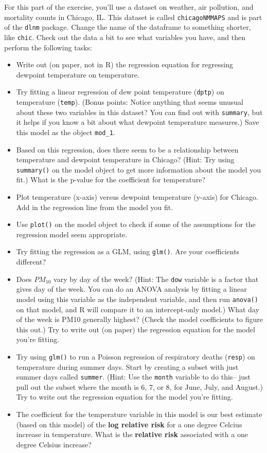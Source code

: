 \documentclass[]{book}
\providecommand{\tightlist}{%
  \setlength{\itemsep}{0pt}\setlength{\parskip}{0pt}}
\theoremstyle{definition}
\theoremstyle{definition}
\theoremstyle{definition}
\theoremstyle{remark}
\begin{document}
For this part of the exercise, you'll use a dataset on weather, air
pollution, and mortality counts in Chicago, IL. This dataset is called
\texttt{chicagoNMMAPS} and is part of the \texttt{dlnm} package. Change
the name of the dataframe to something shorter, like \texttt{chic}.
Check out the data a bit to see what variables you have, and then
perform the following tasks:

\begin{itemize}
\tightlist
\item
  Write out (on paper, not in R) the regression equation for regressing
  dewpoint temperature on temperature.
\item
  Try fitting a linear regression of dew point temperature
  (\texttt{dptp}) on temperature (\texttt{temp}). (Bonus points: Notice
  anything that seems unusual about these two variables in this dataset?
  You can find out with \texttt{summary}, but it helps if you know a bit
  about what dewpoint temperature measures.) Save this model as the
  object \texttt{mod\_1}.
\item
  Based on this regression, does there seem to be a relationship between
  temperature and dewpoint temperature in Chicago? (Hint: Try using
  \texttt{summary()} on the model object to get more information about
  the model you fit.) What is the p-value for the coefficient for
  temperature?
\item
  Plot temperature (x-axis) versus dewpoint temperature (y-axis) for
  Chicago. Add in the regression line from the model you fit.
\item
  Use \texttt{plot()} on the model object to check if some of the
  assumptions for the regression model seem appropriate.
\item
  Try fitting the regression as a GLM, using \texttt{glm()}. Are your
  coefficients different?
\item
  Does \(PM_{10}\) vary by day of the week? (Hint: The \texttt{dow}
  variable is a factor that gives day of the week. You can do an ANOVA
  analysis by fitting a linear model using this variable as the
  independent variable, and then run \texttt{anova()} on that model, and
  R will compare it to an intercept-only model.) What day of the week is
  PM10 generally highest? (Check the model coefficients to figure this
  out.) Try to write out (on paper) the regression equation for the
  model you're fitting.
\item
  Try using \texttt{glm()} to run a Poisson regression of respiratory
  deaths (\texttt{resp}) on temperature during summer days. Start by
  creating a subset with just summer days called \texttt{summer}. (Hint:
  Use the \texttt{month} variable to do this-- just pull out the subset
  where the month is 6, 7, or 8, for June, July, and August.) Try to
  write out the regression equation for the model you're fitting.
\item
  The coefficient for the temperature variable in this model is our best
  estimate (based on this model) of the \textbf{log relative risk} for a
  one degree Celcius increase in temperature. What is the
  \textbf{relative risk} associated with a one degree Celsius increase?
\end{itemize}
\end{document}
